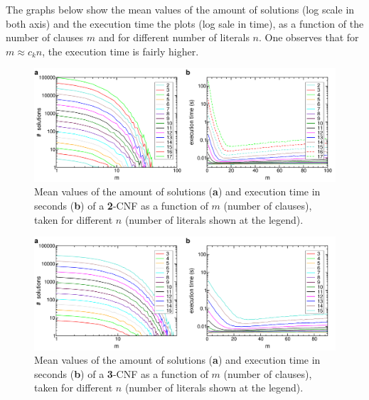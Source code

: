 \documentclass[12pt]{article}
\begin{document}
The graphs below show the mean values of the amount of solutions (log scale in both axis) and the execution time the plots (log sale in time), as a function of the number of clauses $m$ and for different number of literals $n$.
One observes that for $m \approx c_k n$, the execution time is fairly higher.

\begin{figure}[htbp]
  \begin{center}
    \includegraphics[width=15.2cm]{images/k2st.pdf}
    \caption{\small{Mean values of the amount of solutions ({\bf a}) and execution time in seconds ({\bf b}) of a {\bf 2}-CNF as a function of $m$ (number of clauses), taken for different $n$ (number of literals shown at the legend).}}
    \label{fig:k2}
  \end{center}
\end{figure}

\begin{figure}[htbp]
  \begin{center}
    \includegraphics[width=15.2cm]{images/k3st.pdf}
    \caption{\small{Mean values of the amount of solutions ({\bf a}) and execution time in seconds ({\bf b}) of a {\bf 3}-CNF as a function of $m$ (number of clauses), taken for different $n$ (number of literals shown at the legend).}}
    \label{fig:k3}
  \end{center}
\end{figure}
\end{document}
